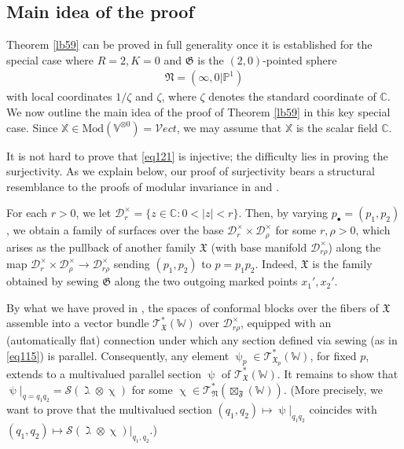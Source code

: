 \documentclass[11pt,b5paper,notitlepage]{article}
\theoremstyle{definition}
\theoremstyle{plain}
\newcommand{\Vect}{\mathcal Vect}
\newcommand{\blt}{\bullet}
\newcommand{\Vbb}{\mathbb V}
\newcommand{\Xbb}{\mathbb X}
\newcommand{\Wbb}{\mathbb W}
\newcommand{\Cbb}{\mathbb C}
\newcommand{\Pbb}{\mathbb P}
\newcommand{\<}{\left\langle}
\renewcommand{\>}{\right\rangle}
\newcommand{\fx}{\mathfrak{X}}
\newcommand{\ST}{\mathscr{T}}
\newcommand{\MD}{\mathcal{D}}
\newcommand{\MS}{\mathcal{S}}
\newcommand{\Mod}{\mathrm{Mod}}
\newcommand{\fn}{\mathfrak{N}}
\newcommand{\ff}{\mathfrak{F}}
\newcommand{\fg}{\mathfrak{G}}
\numberwithin{equation}{section}
\begin{document}
\subsection{Main idea of the proof}


Theorem \ref{lb59} can be proved in full generality once it is established for the special case where $R=2,K=0$ and $\fg$ is the $(2,0)$-pointed sphere
\begin{align*}
\fn=(\infty,0|\Pbb^1)
\end{align*}
with local coordinates $1/\zeta$ and $\zeta$, where $\zeta$ denotes the standard coordinate of $\Cbb$. We now outline the main idea of the proof of Theorem \ref{lb59} in this key special case. Since $\Xbb\in\Mod(\Vbb^{\otimes 0})=\Vect$, we may assume that $\Xbb$ is the scalar field $\Cbb$.


It is not hard to prove that \eqref{eq121} is injective; the difficulty lies in proving the surjectivity. As we explain below, our proof of surjectivity bears a structural resemblance to the proofs of modular invariance in \cite{Miy-modular-invariance} and \cite{Hua-modular-C2}.

For each $r>0$, we let $\MD_r^\times=\{z\in\Cbb:0<|z|<r\}$. Then, by varying $p_\blt=(p_1,p_2)$, we obtain a family of surfaces over the base $\MD_r^\times\times\MD_{\rho}^\times$ for some $r,\rho>0$, which arises as the pullback of another family $\fx$ (with base manifold $\MD^\times_{r\rho}$) along the map $\MD^\times_r\times\MD^\times_\rho\rightarrow\MD^\times_{r\rho}$ sending $(p_1,p_2)$ to $p=p_1p_2$. Indeed, $\fx$ is the family obtained by sewing $\fg$ along the two outgoing marked points $x_1',x_2'$.

By what we have proved in \cite{GZ2}, the spaces of conformal blocks over the fibers of $\fx$ assemble into a vector bundle $\ST^*_\fx(\Wbb)$ over $\MD_{r\rho}^\times$, equipped with an (automatically flat) connection under which any section defined via sewing (as in \eqref{eq115}) is parallel. Consequently, any element $\uppsi_p\in\ST^*_{\fx_p}(\Wbb)$, for fixed $p$, extends to a multivalued parallel section $\uppsi$ of $\ST^*_\fx(\Wbb)$. It remains to show that $\uppsi|_{q=q_1q_2}=\MS(\gimel\otimes\upchi)$ for some $\upchi\in\ST^*_\fn(\boxtimes_\ff(\Wbb))$. (More precisely, we want to prove that the multivalued section $(q_1,q_2)\mapsto\uppsi|_{q_1q_2}$ coincides with $(q_1,q_2)\mapsto\MS(\gimel\otimes\upchi)|_{q_1,q_2}$.)
\end{document}
